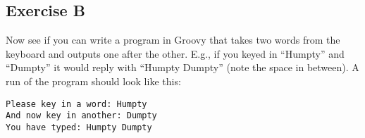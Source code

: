 \subsection*{Exercise B}

Now see if you can write a program in Groovy that takes
two words from the keyboard and outputs one after the other. E.g., if
you keyed in ``Humpty'' and ``Dumpty'' 
it would reply with ``Humpty Dumpty'' (note the space in between).
A run of the program should look like this:
\begin{Verbatim}
Please key in a word: Humpty
And now key in another: Dumpty
You have typed: Humpty Dumpty
\end{Verbatim}


 	


